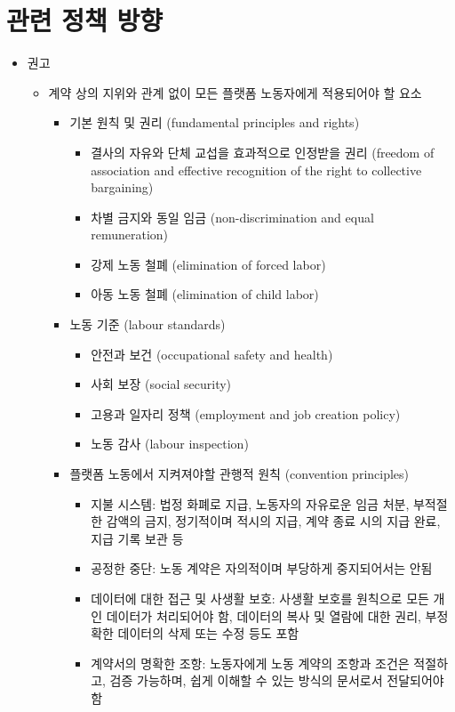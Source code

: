 \section{관련 정책 방향}
\begin{itemize}
\item \cite{International-Labour-Office:2021uk} 권고
	\begin{itemize}
	\item 계약 상의 지위와 관계 없이 모든 플랫폼 노동자에게 적용되어야 할 요소
		\begin{itemize}
		\item 기본 원칙 및 권리 (fundamental principles and rights)
			\begin{itemize}
			\item 결사의 자유와 단체 교섭을 효과적으로 인정받을 권리 (freedom of association and effective recognition of the right to collective bargaining)
			\item 차별 금지와 동일 임금 (non-discrimination and equal remuneration)
			\item 강제 노동 철폐 (elimination of forced labor)
			\item 아동 노동 철폐 (elimination of child labor)
			\end{itemize}
		\item 노동 기준 (labour standards)
			\begin{itemize}
			\item 안전과 보건 (occupational safety and health)
			\item 사회 보장 (social security)
			\item 고용과 일자리 정책 (employment and job creation policy)
			\item 노동 감사 (labour inspection)
			\end{itemize}
		\item 플랫폼 노동에서 지켜져야할 관행적 원칙 (convention principles)
			\begin{itemize}
			\item 지불 시스템: 법정 화폐로 지급, 노동자의 자유로운 임금 처분, 부적절한 감액의 금지, 정기적이며 적시의 지급, 계약 종료 시의 지급 완료, 지급 기록 보관 등
			\item 공정한 중단: 노동 계약은 자의적이며 부당하게 중지되어서는 안됨
			\item 데이터에 대한 접근 및 사생활 보호: 사생활 보호를 원칙으로 모든 개인 데이터가 처리되어야 함, 데이터의 복사 및 열람에 대한 권리, 부정확한 데이터의 삭제 또는 수정 등도 포함
			\item 계약서의 명확한 조항: 노동자에게 노동 계약의 조항과 조건은 적절하고, 검증 가능하며, 쉽게 이해할 수 있는 방식의 문서로서 전달되어야 함

\end{itemize}
\end{itemize}
\end{itemize}
\end{itemize}

